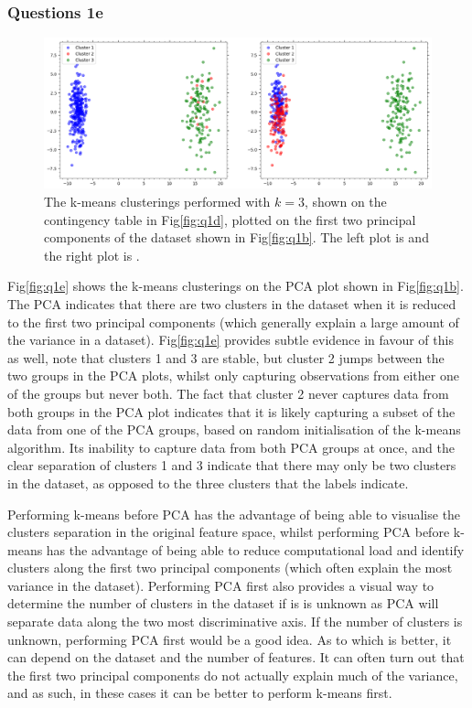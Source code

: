 \subsubsection{Questions 1e}\label{subsubsec:q1e}
    \begin{figure}[htb]
    \centering
    \includegraphics[width=1\textwidth]{./figures/q1e}
    \caption{The k-means clusterings performed with $k=3$, shown on the contingency table in Fig\eqref{fig:q1d}, plotted
        on the first two principal components of the dataset shown in Fig\eqref{fig:q1b}. The left plot is
         and the right plot is .}
    \label{fig:q1e}
    \end{figure}

    Fig\eqref{fig:q1e} shows the k-means clusterings on the PCA plot shown in Fig\eqref{fig:q1b}.
    The PCA indicates that there are two clusters in the dataset when it is reduced to the first two principal components
    (which generally explain a large amount of the variance in a dataset).
    Fig\eqref{fig:q1e} provides subtle evidence in favour of this as well, note that clusters 1 and 3 are stable, but cluster
    2 jumps between the two groups in the PCA plots, whilst only capturing observations from either one of the groups
    but never both.
    The fact that cluster 2 never captures data from both groups in the PCA plot indicates that it is likely capturing
    a subset of the data from one of the PCA groups, based on random initialisation of the k-means algorithm.
    Its inability to capture data from both PCA groups at once, and the clear separation of clusters 1 and 3 indicate
    that there may only be two clusters in the dataset, as opposed to the three clusters that the labels indicate.

    Performing k-means before PCA has the advantage of being able to visualise the clusters separation in the original
    feature space, whilst performing PCA before k-means has the advantage of being able to reduce computational load
    and identify clusters along the first two principal components (which often explain the most variance in the dataset).
    Performing PCA first also provides a visual way to determine the number of clusters in the dataset if is is unknown as
    PCA will separate data along the two most discriminative axis.
    If the number of clusters is unknown, performing PCA first would be a good idea.
    As to which is better, it can depend on the dataset and the number of features.
    It can often turn out that the first two principal components do not actually explain much of the variance, and as
    such, in these cases it can be better to perform k-means first.
